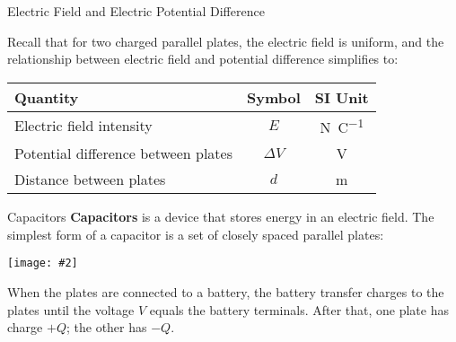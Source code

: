\documentclass[12pt,aspectratio=169]{beamer}
\newcommand{\pic}[2]{\texttt{[image: \#2]}}
\newcommand{\eq}[2]{\vspace{#1}{\Large\begin{displaymath}#2\end{displaymath}}}
\begin{document}
\begin{frame}{Electric Field and Electric Potential Difference}
  \begin{center}
  \end{center}
  \vspace{-.1in}Recall that for two charged parallel plates, the electric field
  is uniform, and the relationship between electric field and potential
  difference simplifies to:

  \eq{-.2in}{
    \boxed{E=\frac{\Delta V}d}
    \quad\text{or}\quad
    \boxed{\Delta V=Ed}
  }
  \begin{center}
    \begin{tabular}{l|c|c}
      \rowcolor{pink}
      \textbf{Quantity} & \textbf{Symbol} & \textbf{SI Unit} \\ \hline
      Electric field intensity & $E$ & \si{\newton\per\coulomb}\\
      Potential difference between plates & $\Delta V$ & \si{\volt} \\
      Distance between plates       & $d$ & \si{\metre}
    \end{tabular}
  \end{center}
\end{frame}



\begin{frame}{Capacitors}
  \textbf{Capacitors} is a device that stores energy in an electric field. The
  simplest form of a capacitor is a set of closely spaced parallel plates:
  \begin{center}
    \pic{.5}{cap19}
  \end{center}
  When the plates are connected to a battery, the battery transfer charges to
  the plates until the voltage $V$ equals the battery terminals. After that,
  one plate has charge $+Q$; the other has $-Q$.
\end{frame}
\end{document}
